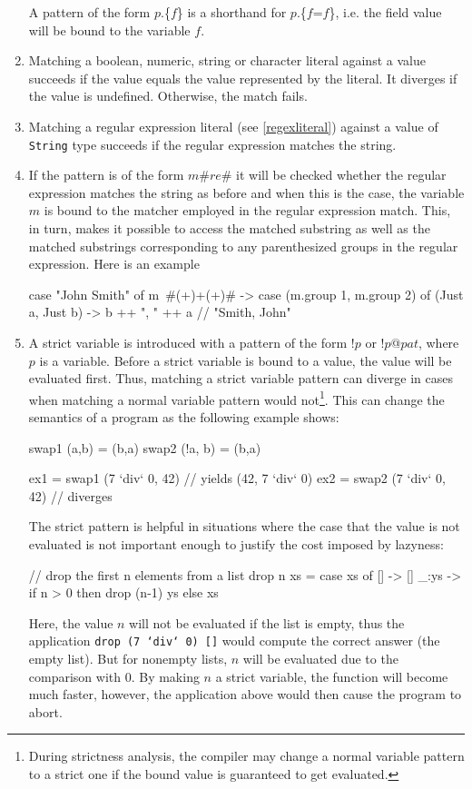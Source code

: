 \begin{enumerate}
A pattern of the form $p$.\{$f$\} is a shorthand for $p$.\{$f$=$f$\}, i.e. the field value will be bound to the variable $f$.

\item Matching a boolean, numeric, string or character literal against a value succeeds if the value equals the value represented by the literal. It diverges if the value is undefined. Otherwise, the match fails.
\item Matching a regular expression literal (see \autoref{regexliteral}) against a value of \texttt{String} type succeeds if the regular expression matches the string.
\item If the pattern is of the form $m$\#$re$\# it will be checked whether the regular expression matches the string as before and when this is the case, the variable $m$ is bound to the matcher employed in the regular expression match. This, in turn, makes it possible to access the matched substring as well as the matched substrings corresponding to any parenthesized groups in the regular expression.
Here is an example
\begin{code}
case "John Smith" of
    m~#(\w+)\s+(\w+)\# ->
        case (m.group 1, m.group 2) of
             (Just a, Just b) -> b ++ ", " ++ a  // "Smith, John"
\end{code}
\item \label{strict pattern} A strict variable is introduced with a pattern of the form !$p$ or !$p$@$pat$, where $p$ is a variable. Before a strict variable is bound to a value, the value will be evaluated first. Thus, matching a strict variable pattern can diverge in cases  when matching a normal variable pattern would not\footnote{
During strictness analysis, the compiler may change a normal variable pattern to a strict one if the bound value is guaranteed to get evaluated.
}.
This can change the semantics of a program as the following example shows:
\begin{code}
swap1 (a,b)   = (b,a)
swap2 (!a, b) = (b,a)

ex1 = swap1 (7 `div` 0, 42)   // yields (42, 7 `div` 0)
ex2 = swap2 (7 `div` 0, 42)   // diverges
\end{code}

The strict pattern is helpful in situations where the case that the value is not evaluated is not important enough to justify the cost imposed by lazyness:
\begin{code}
// drop the first n elements from a list
drop n xs = case xs of
    [] -> []
    _:ys -> if n > 0 then drop (n-1) ys else xs
\end{code}
Here, the value $n$ will not be evaluated if the list is empty, thus the application \texttt{drop (7 `div` 0) []} would compute the correct answer (the empty list). But for nonempty lists, $n$ will be evaluated due to the comparison with 0. By making $n$ a strict variable, the function will become much faster, however, the application above would then cause the program to abort.

\end{enumerate}
